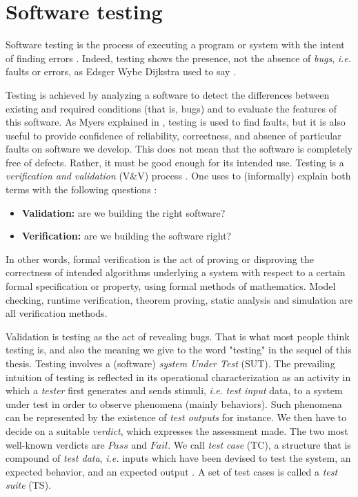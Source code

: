 \section{Software testing}
\label{sec:related:testing}

Software testing is the process of executing a program or system
with the intent of finding errors \cite{Myers:1979:AST:539883}.
Indeed, testing shows the presence, not the absence of
\emph{bugs}, \emph{i.e.} faults or errors, as Edsger Wybe
Dijkstra used to say \cite{Buxton:1970:SET:1102021}.

Testing is achieved by analyzing a software to detect the
differences between existing and required conditions (that is,
bugs) and to evaluate the features of this software. As Myers
explained in \cite{Myers:1979:AST:539883}, testing is used to
find faults, but it is also useful to provide confidence of
reliability, correctness, and absence of particular faults on
software we develop. This does not mean that the software is
completely free of defects. Rather, it must be good enough for
its intended use. Testing is a \emph{verification and validation}
(V\&V) process \cite{wallace1989software}. One uses to
(informally) explain both terms with the following questions
\cite{Boehm1979}:

\begin{itemize}
    \item \textbf{Validation:} are we building the right software?
    \item \textbf{Verification:} are we building the software right?
\end{itemize}

In other words, formal verification is the act of proving or
disproving the correctness of intended algorithms underlying a
system with respect to a certain formal specification or
property, using formal methods of mathematics. Model checking,
runtime verification, theorem proving, static analysis and
simulation are all verification methods.

Validation is testing as the act of revealing bugs. That is what
most people think testing is, and also the meaning we give to the
word "testing" in the sequel of this thesis. Testing involves a
(software) \textit{system Under Test} (SUT). The prevailing
intuition of testing is reflected in its operational
characterization as an activity in which a \textit{tester} first
generates and sends stimuli, \emph{i.e.} \textit{test input} data, to a
system under test in order to observe phenomena (mainly
behaviors). Such phenomena can be represented by the existence of
\textit{test outputs} for instance. We then have to decide on a
suitable \textit{verdict}, which expresses the assessment made.
The two most well-known verdicts are $Pass$ and $Fail$.
We call \textit{test case} (TC), a structure that is compound of
\textit{test data}, \emph{i.e.}  inputs which have been devised
to test the system, an expected behavior, and an expected output
\cite{5733835}. A set of test cases is called a \textit{test
suite} (TS).

